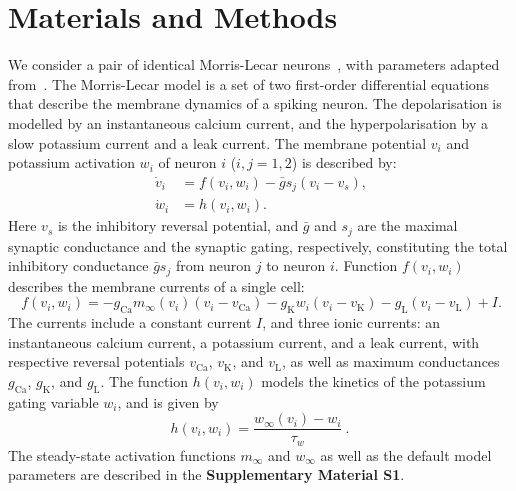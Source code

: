 \documentclass[utf8]{frontiersFPHY} %
\renewcommand{\k}{\mathrm{K}}
\newcommand{\ca}{\mathrm{Ca}}
\newcommand{\leak}{\mathrm{L}}
\newcommand{\gbar}{\bar g}
\begin{document}
\section{Materials and Methods}
We consider a pair of identical Morris-Lecar neurons~\citep{morris1981}, with parameters adapted from~\cite{bose2011}.
The Morris-Lecar model is a set of two first-order differential equations that describe the membrane dynamics of a spiking neuron.
The depolarisation is modelled by an instantaneous calcium current, and the hyperpolarisation by a slow potassium current and a leak current.
The membrane potential $v_{i}$ and potassium activation $w_{i}$ of neuron $i$ ($i, j=1,2$) is described by:
\begin{align}
    ~\label{eq:cell-modelA}
     \dot v_{i}&= f(v_{i}, w_{i}) -\gbar s_j(v_i-v_{s}),\\
    ~\label{eq:cell-modelB}
     \dot w_{i} &=h(v_i,w_i).
   \end{align}
Here $v_{s}$ is the inhibitory reversal potential, and $\gbar$ and $s_{j}$ are the maximal synaptic conductance and the synaptic gating, respectively, constituting the total inhibitory conductance $\gbar s_{j}$ from neuron $j$ to neuron $i$.
Function $f(v_{i}, w_{i})$ describes the membrane currents of a single cell:
\begin{equation}
 ~\label{eq:memcur}
  f(v_{i}, w_{i}) = -g_{\ca}m_{\infty}(v_{i})(v_{i}-v_{\ca}) - g_{\k}w_{i}(v_{i}-v_{\k})-g_{\leak}(v_{i}-v_{\leak}) + I.
\end{equation}
The currents include a constant current $I$, and three ionic currents:
an instantaneous calcium current, a potassium current, and a leak current, with respective reversal potentials $v_{\ca}$, $v_{\k}$, and $v_{\leak}$, as well as maximum conductances $g_{\ca}$, $g_{\k}$, and $g_{\leak}$.
The function $h(v_{i}, w_{i})$ models the kinetics of the potassium gating variable $w_{i}$, and is given by
\begin{equation}
  h(v_{i}, w_{i})=\frac{w_{\infty}(v_{i})-w_{i}}{\tau_{w}}~\label{eq:h}.
\end{equation}
The steady-state activation functions $m_{\infty}$ and $w_{\infty}$ as well as the default model parameters are described in the \textbf{Supplementary Material S1}.
\end{document}
